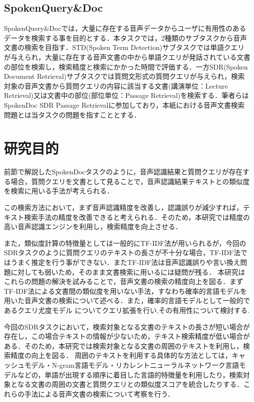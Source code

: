 \subsection{SpokenQuery\&Doc}
SpokenQuery\&Docでは，大量に存在する音声データからユーザに有用性のあるデータを検索する事を目的とする．本タスクでは，2種類のサブタスクから音声文書の検索を目指す．STD(Spoken Term Detection)サブタスクでは単語クエリが与えられ，大量に存在する音声文書の中から単語クエリが発話されている文書の部位を検索し，検索精度と検索にかかった時間で評価する．一方SDR(Spoken Document Retrieval)サブタスクでは質問文形式の質問クエリが与えられ，検索対象の音声文書から質問クエリの内容に該当する文書(講演単位：Lecture Retrieval)又は文書中の部位(部位単位：Passage Retrieval)を検索する．筆者らはSpokenDoc SDR Passage Retrievalに参加しており，本紙における音声文書検索問題とは当タスクの問題を指すこととする．

\section{研究目的}
前節で解説したSpokenDocタスクのように，音声認識結果と質問クエリが存在する場合，質問クエリを文書として見ることで，音声認識結果テキストとの類似度を検索に用いる手法が考えられる．

この検索方法において，まず音声認識精度を改善し，認識誤りが減少すれば，テキスト検索手法の精度を改善できると考えられる．そのため，本研究では精度の高い音声認識エンジンを利用し，検索精度を向上させる．

また，類似度計算の特徴量としては一般的にTF-IDF法が用いられるが，今回のSDRタスクのように質問クエリのテキストの長さが不十分な場合，TF-IDF法ではうまく推定を行う事ができない．またTF-IDF法は音声認識誤りや言い換え問題に対しても弱いため，そのまま文書検索に用いるには疑問が残る．
本研究はこれらの問題の解決を試みることで，音声文書の検索の精度向上を図る．まずTF-IDF法による文書間の類似度を用いない手法，すなわち確率的言語モデルを用いた音声文書の検索について述べる．また，確率的言語モデルとして一般的であるクエリ尤度モデル \cite{query_likelihood}についてクエリ拡張を行い,その有用性について検討する.

今回のSDRタスクにおいて，検索対象となる文書のテキストの長さが短い場合が存在し，この場合テキストの情報が少ないため，テキスト検索精度が低い場合がある．そのため，本研究では検索対象となる文書の周囲のテキストを利用し，検索精度の向上を図る．
周囲のテキストを利用する具体的な方法としては，キャッシュモデル・N-gram言語モデル・リカレントニューラルネットワーク言語モデルなどの，単語が出現する順序に着目した言語的特徴量を利用したり，検索対象となる文書の周囲の文書と質問クエリとの類似度スコアを統合したりする．これらの手法による音声文書の検索について考察を行う．

